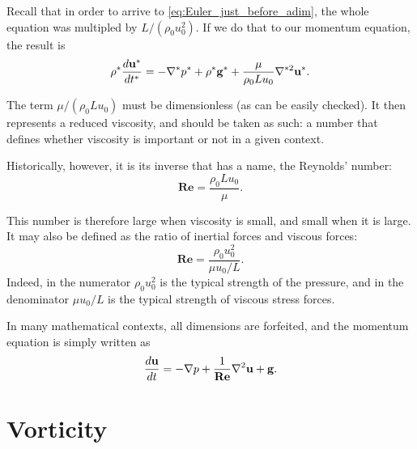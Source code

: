 Recall that in order to arrive to \ref{eq:Euler_just_before_adim}, the
whole equation was multipled by $L/(\rho_0 u_0^2)$. If we do that to our
momentum equation, the result is
\[
\rho^* \frac{d\mathbf{u}^* }{dt^* } =
-  \nabla^* p^*
+  \rho^* \mathbf{g}^* +
\frac{\mu }{\rho_ 0 L u_0 } \nabla^{*2} \mathbf{u}^* .
\]

The term $\mu /( \rho_ 0 L u_0)$ must be dimensionless (as can be
easily checked). It then represents a reduced viscosity, and should be
taken as such: a number that defines whether viscosity is important or
not in a given context.

Historically, however, it is its inverse that has a name, the
Reynolds' number:
\begin{equation}
  \mathbf{Re}= \frac{\rho_ 0 L u_0 }{\mu }.
\end{equation}

This number is therefore large when viscosity is small, and small when
it is large. It may also be defined as the ratio of inertial forces and
viscous forces:
\begin{equation}
  \mathbf{Re}= \frac{\rho_ 0 u^2_0 }{\mu u_0 / L }.
\end{equation}
Indeed, in the numerator $\rho_ 0 u^2_0$ is the typical strength of the
pressure, and in the denominator $\mu u_0 / L $ is the typical
strength of viscous stress forces.

In many mathematical contexts, all dimensions are forfeited, and the
momentum equation is simply written as
\begin{equation}
  \label{eq:NS_usual_reduced}
  \frac{d\mathbf{u} }{dt} =
  - \nabla p 
  + \frac{1}{\mathbf{Re}} \nabla^2 \mathbf{u}
  + \mathbf{g} .
\end{equation}







\section{Vorticity}
\label{sec:NS_vort}

